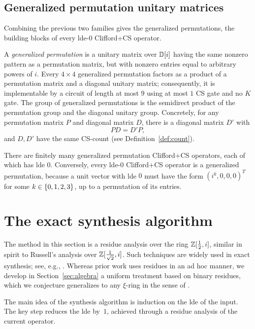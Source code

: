 \documentclass[reprint,amsmath,amssymb,aps,pra]{revtex4-2}
\begin{document}
\subsection{Generalized permutation unitary matrices}
\label{ssec:gp}

Combining the previous two families gives the generalized
permutations, the building blocks of every lde-$0$ Clifford+CS
operator.

A \emph{generalized permutation} is a unitary matrix over ${\mathbb D}[i]$
having the same nonzero pattern as a permutation matrix, but with
nonzero entries equal to arbitrary powers of $i$. Every $4 \times 4$
generalized permutation factors as a product of a permutation matrix
and a diagonal unitary matrix; consequently, it is implementable by a
circuit of length at most $9$ using at most $1$ CS gate and no $K$
gate. The group of generalized permutations is the semidirect product
of the permutation group and the diagonal unitary group. Concretely,
for any permutation matrix $P$ and diagonal matrix $D$, there is a
diagonal matrix $D'$ with
\[
  PD = D'P,
\]
and $D, D'$ have the same CS-count (see Definition~\ref{def:count}).

There are finitely many generalized permutation Clifford+CS operators,
each of which has lde $0$. Conversely, every lde-$0$ Clifford+CS
operator is a generalized permutation, because a unit vector with lde
$0$ must have the form $(i^k, 0, 0, 0)^T$ for some
$k \in \left\{0,1,2,3\right\}$, up to a permutation of its entries.

\section{The exact synthesis algorithm}\label{ssec:synthesis}
The method in this section is a residue analysis over the ring
$\mathbb{Z}[\tfrac{1}{2}, i]$, similar in spirit to Russell's
\cite{russell2014} analysis over $\mathbb{Z}[\frac{1}{\sqrt 2}, i]$. Such
techniques are widely used in exact synthesis; see, e.g.,
\cite{giles2013remarks,GilesSelinger2013,Glaudell2021,Li_2023_CT2,amy2023improved}.
Whereas prior work uses residues in an ad hoc manner, we develop in
Section~\ref{sec:algebra} a uniform treatment based on binary
residues, which we conjecture generalizes to any $\xi$-ring in the
sense of \cite{KliuchnikovSchonnenbeck2024}.

The main idea of the synthesis algorithm is induction on the lde of
the input. The key step reduces the lde by~$1$, achieved through a
residue analysis of the current operator.
\end{document}
